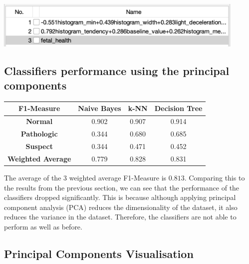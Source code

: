 \documentclass[12pt]{article}
\begin{document}
\begin{center}
    \includegraphics[width=12cm]{images/7_1_preprocess_principal_components.png}
\end{center}

\subsection{Classifiers performance using the principal components}

\begin{center}
    \begin{tabular}{| c | c | c | c |}
        \hline
        \textbf{F1-Measure}       & \textbf{Naive Bayes} & \textbf{k-NN} & \textbf{Decision Tree} \\ [0.5ex]
        \hline
        \textbf{Normal}           & 0.902                & 0.907         & 0.914                  \\
        \hline
        \textbf{Pathologic}       & 0.344                & 0.680         & 0.685                  \\
        \hline
        \textbf{Suspect}          & 0.344                & 0.471         & 0.452                  \\
        \hline
        \hline
        \textbf{Weighted Average} & 0.779                & 0.828         & 0.831                  \\
        \hline
    \end{tabular}
\end{center}

The average of the 3 weighted average F1-Measure is $0.813$. Comparing this to the results from the previous section,
we can see that the performance of the classifiers dropped significantly. This is because although applying principal
component analysis (PCA) reduces the dimensionality of the dataset, it also reduces the variance in the dataset. Therefore,
the classifiers are not able to perform as well as before.

\subsection{Principal Components Visualisation}
\end{document}
